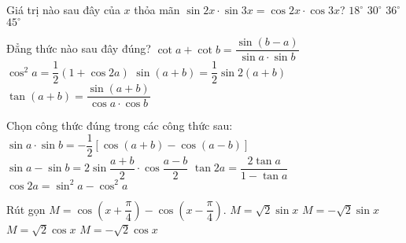 \begin{ex}%
Giá trị nào sau đây của $x$ thỏa mãn $\sin 2x\cdot \sin 3x=\cos 2x\cdot\cos 3x$?
\choice
{\True $18^\circ$}
{$30^\circ$}
{$36^\circ$}
{$45^\circ$}
\end{ex}

\begin{ex}%
Đẳng thức nào sau đây đúng?
\choice
{$\cot a+\cot b=\dfrac{{\sin \left({b-a}\right)}}{{\sin a\cdot \sin b}}$}
{\True $\cos ^2a=\dfrac{1}{2}\left({1+\cos 2a}\right)$}
{$\sin \left({a+b}\right)=\dfrac{1}{2}\sin 2\left({a+b}\right)$}
{$\tan \left({a+b}\right)=\dfrac{{\sin \left({a+b}\right)}}{{\cos a\cdot\cos b}}$}
\end{ex}

\begin{ex}%
Chọn công thức đúng trong các công thức sau:
\choice
{$\sin a\cdot \sin b=-\dfrac{1}{2}\left[{\cos \left({a+b}\right)-\cos \left({a-b}\right)}\right]$}
{\True $\sin a-\sin b=2\sin \dfrac{{a+b}}{2}\cdot \cos\dfrac{{a-b}}{2}$}
{$\tan 2a=\dfrac{{2\tan a}}{{1-\tan a}}$}
{$\cos 2a=\sin ^2a-\cos ^2a$}
\loigiai{ 
  } 
\end{ex}

\begin{ex}%
Rút gọn $M=\cos \left({x+\dfrac{\pi}{4}}\right)-\cos \left({x-\dfrac{\pi}{4}}\right).$
\choice
{$M=\sqrt{2}\sin x$}
{\True $M=-\sqrt{2}\sin x$}
{$M=\sqrt{2}\cos x$}
{$M=-\sqrt{2}\cos x$}
\end{ex}

